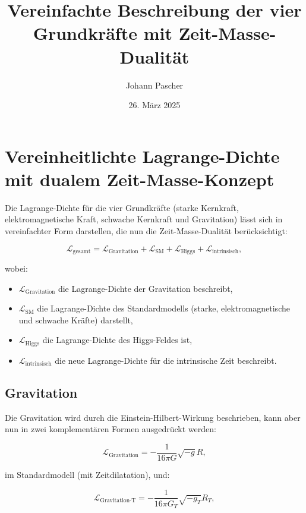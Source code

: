 \documentclass{article}
\title{Vereinfachte Beschreibung der vier Grundkräfte mit Zeit-Masse-Dualität}
\author{Johann Pascher}
\date{26. März 2025}
\begin{document}
	\maketitle
	
	\tableofcontents
	\newpage
	
	\section{Vereinheitlichte Lagrange-Dichte mit dualem Zeit-Masse-Konzept}
	
	Die Lagrange-Dichte für die vier Grundkräfte (starke Kernkraft, elektromagnetische Kraft, schwache Kernkraft und Gravitation) lässt sich in vereinfachter Form darstellen, die nun die Zeit-Masse-Dualität berücksichtigt:
	
	\begin{equation}
		\mathcal{L}_\text{gesamt} = \mathcal{L}_\text{Gravitation} + \mathcal{L}_\text{SM} + \mathcal{L}_\text{Higgs} + \mathcal{L}_\text{intrinsisch},
	\end{equation}
	
	wobei:
	\begin{itemize}
		\item $\mathcal{L}_\text{Gravitation}$ die Lagrange-Dichte der Gravitation beschreibt,
		\item $\mathcal{L}_\text{SM}$ die Lagrange-Dichte des Standardmodells (starke, elektromagnetische und schwache Kräfte) darstellt,
		\item $\mathcal{L}_\text{Higgs}$ die Lagrange-Dichte des Higgs-Feldes ist,
		\item $\mathcal{L}_\text{intrinsisch}$ die neue Lagrange-Dichte für die intrinsische Zeit beschreibt.
	\end{itemize}
	
	\subsection{Gravitation}
	Die Gravitation wird durch die Einstein-Hilbert-Wirkung beschrieben, kann aber nun in zwei komplementären Formen ausgedrückt werden:
	
	\begin{equation}
		\mathcal{L}_\text{Gravitation} = -\frac{1}{16\pi G} \sqrt{-g} R,
	\end{equation}
	
	im Standardmodell (mit Zeitdilatation), und:
	
	\begin{equation}
		\mathcal{L}_\text{Gravitation-T} = -\frac{1}{16\pi G_T} \sqrt{-g_T} R_T,
	\end{equation}
	
\end{document}
